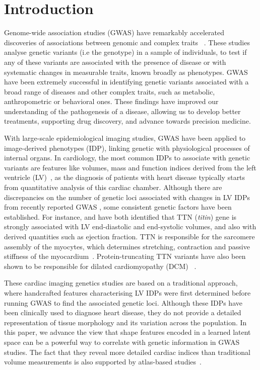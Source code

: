 \section*{Introduction}
Genome-wide association studies (GWAS) have remarkably accelerated discoveries of associations between genomic and complex traits ~\cite{ref_gwas_review}. These studies analyse genetic variants (i.e the genotype) in a sample of individuals, to test if any of these variants are associated with the presence of disease or with systematic changes in measurable traits, known broadly as phenotypes. GWAS have been extremely successful in identifying genetic variants associated with a broad range of diseases and other complex traits, such as metabolic, anthropometric or behavioral ones. These findings have improved our understanding of the pathogenesis of a disease, allowing us to develop better treatments, supporting drug discovery, and advance towards precision medicine.

With large-scale epidemiological imaging studies, GWAS have been applied to image-derived phenotypes (IDP), linking genetic with physiological processes of internal organs. In cardiology, the most common IDPs to associate with genetic variants are features like volumes, mass and function indices derived from the left ventricle (LV)~\cite{ref_nayaung, ref_biffi}, as the diagnosis of patients with heart disease typically starts from quantitative analysis of this cardiac chamber. Although there are discrepancies on the number of genetic loci associated with changes in LV IDPs from recently reported GWAS \cite{ref_nayaung, ref_pirruccello, ref_biffi}, some consistent genetic factors have been established. 
For instance, \cite{ref_nayaung} and \cite{ref_pirruccello} have both identified that TTN ({\em titin}) gene is strongly associated with LV end-diastolic and end-systolic volumes, and also with derived quantities such as ejection fraction. TTN is responsible for the sarcomere assembly of the myocytes, which determines stretching, contraction and passive stiffness of the myocardium~\cite{granzier_giant_2004}. Protein-truncating TTN variants have also been shown to be responsible for dilated cardiomyopathy (DCM) ~\cite{tayal_phenotype_2017}.

These cardiac imaging genetics studies are based on a traditional approach, where handcrafted features characterising LV IDPs were first determined before running GWAS to find the associated genetic loci. Although these IDPs have been clinically used to diagnose heart disease, they do not provide a detailed representation of tissue morphology and its variation across the population. In this paper, we advance the view that shape features encoded in a learned latent space can be a powerful way to correlate with genetic information in GWAS studies. The fact that they reveal more detailed cardiac indices than traditional volume measurements is also supported by atlas-based studies~\cite{gilbert_independent_2019, medrano-gracia_left_2014}.

